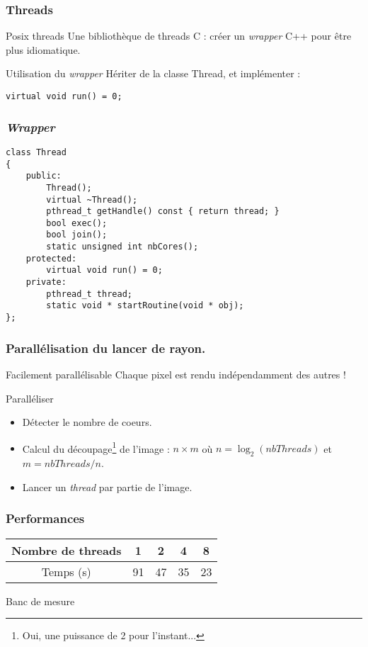 \begin{frame}[fragile]
\frametitle{Threads}

\begin{block}{Posix threads}
Une bibliothèque de threads C : créer un \emph{wrapper} C++ pour être plus idiomatique.
\end{block}

\begin{block}{Utilisation du \emph{wrapper}}
Hériter de la classe Thread, et implémenter :
\begin{verbatim}
virtual void run() = 0;
\end{verbatim}
\end{block}

\end{frame}

\begin{frame}[fragile]
\frametitle{\emph{Wrapper}}
\begin{verbatim}
class Thread
{
    public:
        Thread();
        virtual ~Thread();
        pthread_t getHandle() const { return thread; }
        bool exec();
        bool join();
        static unsigned int nbCores();
    protected:
        virtual void run() = 0;
    private:
        pthread_t thread;
        static void * startRoutine(void * obj);
};
\end{verbatim}
\end{frame}


\begin{frame}
\frametitle{Parallélisation du lancer de rayon.}

\begin{block}{Facilement parallélisable}
Chaque pixel est rendu indépendamment des autres !
\end{block}

\begin{block}{Paralléliser}
\begin{itemize}
\item Détecter le nombre de coeurs.
\item Calcul du découpage\footnote{Oui, une puissance de 2 pour l'instant...} de l'image : $n \times m $ où $ n = \log_2(nbThreads) $ et $ m = nbThreads / n$.
\item Lancer un \emph{thread} par partie de l'image.
\end{itemize}
\end{block}

\end{frame}

\begin{frame}
\frametitle{Performances}
\begin{tabular}{|c|c|c|c|c|}
\hline 
Nombre de threads & 1 & 2 & 4 & 8 \\ 
\hline 
Temps (s) & 91 & 47 & 35 & 23 \\ 
\hline 
\end{tabular} 
\begin{block}{Banc de mesure}
\end{block}

\end{frame}

